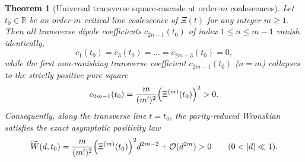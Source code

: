 \documentclass[11pt,reqno,a4paper]{amsart}
\theoremstyle{plain}
\newtheorem{theorem}{Theorem}[section]
\theoremstyle{definition}
\theoremstyle{remark}
\numberwithin{equation}{section}
\newcommand{\fac}{\mathclose{\mathchar"0021}}
\begin{document}
\begin{theorem}[Universal transverse square-cascade at order-$m$ coalescences]\label{thm:square_cascade}
Let $t_0 \in \mathbb{R}$ be an order-$m$ critical-line coalescence of $\Xi(t)$ for any integer $m \ge 1$. Then all transverse dipole coefficients $c_{2n-1}(t_0)$ of index $1 \le n \le m-1$ vanish identically,
\begin{equation}\label{eq:lower_c_vanish}
  c_1(t_0) = c_3(t_0) = \dots = c_{2m-3}(t_0) = 0,
\end{equation}
while the first non-vanishing transverse coefficient $c_{2m-1}(t_0)$ ($n = m$) collapses to the strictly positive pure square
\begin{equation}\label{eq:cascade_pure_square}
  c_{2m-1}(t_0) = \frac{m}{(m\fac)^2}\Big(\Xi^{(m)}(t_0)\Big)^2 > 0.
\end{equation}
Consequently, along the transverse line $t = t_0$, the parity-reduced Wronskian satisfies the exact asymptotic positivity law
\begin{equation}\label{eq:transverse_barrier_asymptotic}
  \widetilde{W}(d, t_0) = \frac{m}{(m\fac)^2}\Big(\Xi^{(m)}(t_0)\Big)^2 d^{2m-2} + \mathcal{O}(d^{2m}) > 0
  \qquad (0 < |d| \ll 1).
\end{equation}
\end{theorem}
\end{document}
